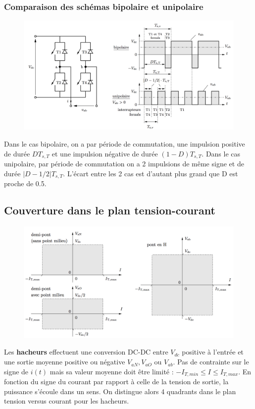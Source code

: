 		\subsubsection{Comparaison des schémas bipolaire et unipolaire}
			\begin{figure}
			\vspace{-5mm}
			\includegraphics[scale=0.2]{ch4/12}
			\end{figure}
			Dans le cas bipolaire, on a par période de commutation, une impulsion positive de durée $DT_{s,T}$ et une impulsion négative de durée $(1-D)T_{s,T}$. Dans le cas unipolaire, par période de commutation on a 2 impulsions de même signe et de durée $|D-1/2|T_{s,T}$. L'écart entre les 2 cas est d'autant plus grand que D est proche de 0.5.
			\newpage
			
	\subsection{Couverture dans le plan tension-courant}
		\begin{figure}
		\vspace{-5mm}
		\includegraphics[scale=0.28]{ch4/13}
		\end{figure}
		Les \textbf{hacheurs} effectuent une conversion DC-DC entre $V_{dc}$ positive à l'entrée et une sortie moyenne positive ou négative $V_{aN}, V_{aO}$ ou $V_{ab}$. Pas de contrainte sur le signe de $i(t)$ mais sa valeur moyenne doit être limité : $-I_{T,min}\leq I \leq I_{T,max}$. En fonction du signe du courant par rapport à celle de la tension de sortie, la puissance s'écoule dans un sens. On distingue alors 4 quadrants dans le plan tension versus courant pour les hacheurs. 
		
